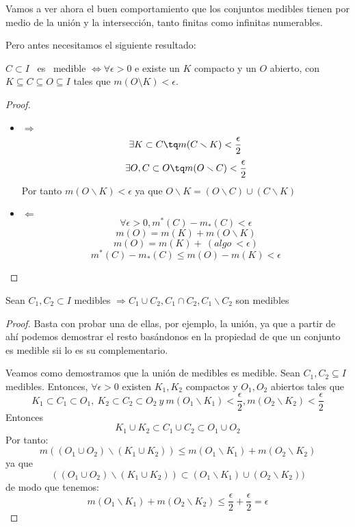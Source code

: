 \documentclass{apuntes}
\begin{document}
Vamos a ver ahora el buen comportamiento que los conjuntos medibles tienen por medio de la unión y la intersección, tanto finitas como infinitas numerables.

Pero antes necesitamos el siguiente resultado:
\begin{prop} $C \subset I$ \ es \ medible $\Leftrightarrow \forall \epsilon > 0$ e existe un $K$ compacto y un $O$ abierto, con $K⊆C⊆O⊆I$ tales que $m(O\setminus K) < \epsilon$.
\end{prop}

\begin{proof}
\begin{itemize}
\item $\Rightarrow$
\[\exists K \subset C \tq m(C\smallsetminus K ) < \frac{\epsilon}{2}\]
\[\exists O, C \subset O \tq m(O\smallsetminus C ) < \frac{\epsilon}{2} \]
Por tanto $m(O\smallsetminus K) < \epsilon$ ya que $O \smallsetminus K = (O \smallsetminus C) \cup (C \smallsetminus K)$

\item $\Leftarrow$
\[\forall \epsilon > 0, m^*(C)-m_*(C) < \epsilon\]
\[m(O)=m(K) + m(O\smallsetminus K)\]
\[m(O) = m(K) + \ (algo \ < \epsilon)\]
\[m^*(C) - m_*(C) \leq m(O)-m(K) < \epsilon\]
\end{itemize}
\end{proof}

\begin{prop}
Sean $C_1, C_2 \subset I$ medibles $\Rightarrow C_1 \cup C_2, C_1 \cap C_2, C_1\smallsetminus C_2$  son medibles
\end{prop}
\begin{proof}
Basta con probar una de ellas, por ejemplo, la unión, ya que a partir de ahí podemos demostrar el resto basándonos en la propiedad de que un conjunto es medible sii lo es su complementario.

Veamos como demostramos que la unión de medibles es medible. Sean $C_1,C_2⊆I$ medibles. Entonces, $\forall \epsilon > 0$ existen $K_1, K_2$ compactos y $O_1, O_2$ abiertos tales que
\[K_1 \subset C_1 \subset O_1, \ K_2 \subset C_2 \subset O_2 \ y \ m(O_1 \smallsetminus K_1) < \frac{\epsilon}{2}, m(O_2 \smallsetminus K_2) < \frac{\epsilon}{2}\]
Entonces
\[K_1\cup K_2 \subset C_1 \cup C_2 \subset O_1\cup O_2\]
Por tanto:
\[m((O_1 \cup O_2)\smallsetminus (K_1 \cup K_2)) \leq m(O_1 \smallsetminus K_1) + m(O_2 \smallsetminus K_2) \]
ya que
\[((O_1 \cup O_2)\smallsetminus (K_1 \cup K_2)) \subset (O_1 \smallsetminus K_1)\cup (O_2 \smallsetminus K_2)) \]
de modo que tenemos:
\[m(O_1 \smallsetminus K_1) + m(O_2 \smallsetminus K_2) \leq \frac{\epsilon}{2} + \frac{\epsilon}{2} = \epsilon\]
\end{proof}
\end{document}
